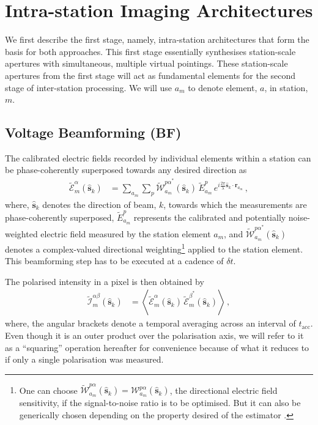 \documentclass[
  journal=pasa,
  manuscript=article-type,
  year=2020,
  volume=37,
]{cup-journal}
\begin{document}
\section{Intra-station Imaging Architectures} \label{sec:intra-station-arch}

We first describe the first stage, namely, intra-station architectures that form the basis for both approaches. This first stage essentially synthesises station-scale apertures with simultaneous, multiple virtual pointings. These station-scale apertures from the first stage will act as fundamental elements for the second stage of inter-station processing. We will use $a_m$ to denote element, $a$, in station, $m$.

\subsection{Voltage Beamforming (BF)}

The calibrated electric fields recorded by individual elements within a station can be phase-coherently superposed towards any desired direction as
\begin{align}
    \widetilde{\mathcal{E}}_m^\alpha(\hat{\boldsymbol{s}}_k) &= \sum_{a_m} \sum_p  \widetilde{\mathcal{W}}_{a_m}^{{p\alpha}^*}(\hat{\boldsymbol{s}}_k) \, \widetilde{E}_{a_m}^p \, e^{i\frac{2\pi}{\lambda} \hat{\boldsymbol{s}}_k\cdot\boldsymbol{r}_{a_m}} \, , \label{eqn:intra-station-pol-hol-img-expl}
\end{align}
where, $\hat{\boldsymbol{s}}_k$ denotes the direction of beam, $k$, towards which the measurements are phase-coherently superposed, $\widetilde{E}_{a_m}^{p}$ represents the calibrated and potentially noise-weighted electric field measured by the station element $a_m$, and $\widetilde{\mathcal{W}}_{a_m}^{{p\alpha}^*}(\hat{\boldsymbol{s}}_k)$ denotes a complex-valued directional weighting\footnote{One can choose $\widetilde{\mathcal{W}}_{a_m}^{p\alpha}(\hat{\boldsymbol{s}}_k)=\mathcal{W}_{a_m}^{p\alpha}(\hat{\boldsymbol{s}}_k)$, the directional electric field sensitivity, if the signal-to-noise ratio is to be optimised. But it can also be generically chosen depending on the property desired of the estimator \cite[][]{Morales2011}.} applied to the station element. This beamforming step has to be executed at a cadence of $\delta t$. 

The polarised intensity in a pixel is then obtained by
\begin{align}
    \widetilde{\mathcal{I}}^{\alpha\beta}_m(\hat{\boldsymbol{s}}_k) &= \left\langle \widetilde{\mathcal{E}}_m^\alpha(\hat{\boldsymbol{s}}_k) \,  \widetilde{\mathcal{E}}_m^{\beta^*}(\hat{\boldsymbol{s}}_k) \right\rangle \, , \label{eqn:intra-station-opt-pol-img-outprod}
\end{align}
where, the angular brackets denote a temporal averaging across an interval of $t_\textrm{acc}$. Even though it is an outer product over the polarisation axis, we will refer to it as a ``squaring'' operation hereafter for convenience because of what it reduces to if only a single polarisation was measured. 
\end{document}
